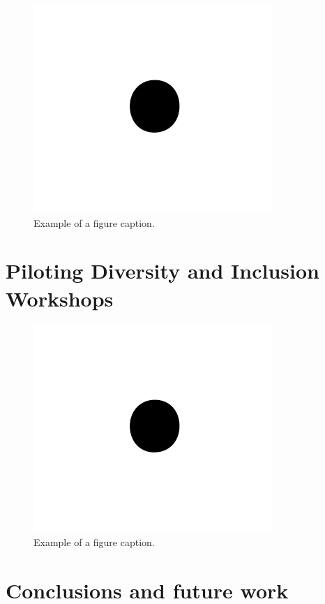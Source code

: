 \documentclass[conference]{IEEEtran}
\begin{document}
\begin{figure}[htbp]
    \centerline{\includegraphics{fig1.png}}
    \caption{Example of a figure caption.}
    \label{fig}
\end{figure}


\section{Piloting Diversity and Inclusion Workshops}
\lipsum[1]

\begin{figure}[htbp]
    \centerline{\includegraphics{fig1.png}}
    \caption{Example of a figure caption.}
    \label{fig}
\end{figure}

\section{Conclusions and future work}
\lipsum[1]
\end{document}
